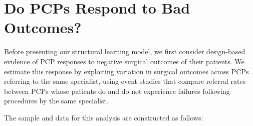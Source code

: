 \documentclass[12pt]{article}
\begin{document}

\section{Do PCPs Respond to Bad Outcomes?}
\label{sec:reduced_form}

Before presenting our structural learning model, we first consider design-based evidence of PCP responses to negative surgical outcomes of their patients. We estimate this response by exploiting variation in surgical outcomes across PCPs referring to the same specialist, using event studies that compare referral rates between PCPs whose patients do and do not experience failures following procedures by the same specialist. 

The sample and data for this analysis are constructed as follows:
\end{document}

